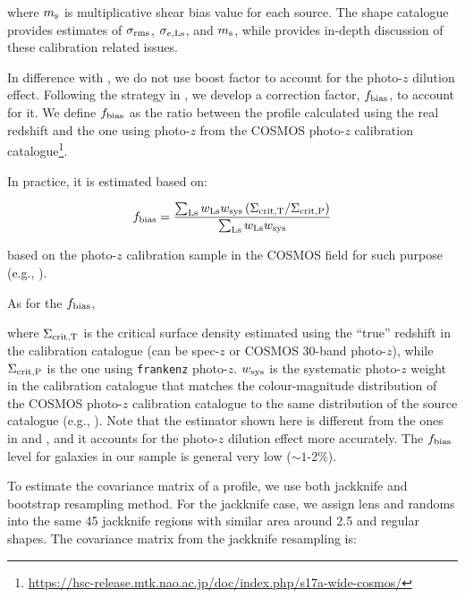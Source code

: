 \documentclass[fleqn,usenatbib,useAMS]{mnras}
\begin{document}
    \noindent where $m_{\rm s}$ is multiplicative shear bias value for each source.
    The shape catalogue provides estimates of $\sigma_{\rm rms}$, $\sigma_{e, \rm Ls}$, and $m_{\rm
    s}$, while \citet{HSC-WLCALIB} provides in-depth discussion of these calibration related
    issues.

    In difference with \citet{Singh2017}, we do not use boost factor to account for the photo-$z$
    dilution effect.
    Following the strategy in \citet{Leauthaud2017}, we develop a correction
    factor, $f_{\rm bias}$, to account for it.
    We define $f_{\rm bias}$ as the ratio between the \dsigma{} profile calculated using
    the real redshift and the one using photo-$z$ from the COSMOS photo-$z$ calibration
    catalogue\footnote{
    \url{https://hsc-release.mtk.nao.ac.jp/doc/index.php/s17a-wide-cosmos/}}.

    In practice, it is estimated based on:

    \begin{equation}
        f_{\rm bias} = \frac{
            \sum_{\rm Ls} w_{\rm Ls} w_{\rm sys} \left(\Sigma_{{\rm crit, T}} / \Sigma_{{\rm crit, P}} \right)}
            {\sum_{\rm Ls} w_{\rm Ls} w_{\rm sys}}
        \label{eq:fbias}
    \end{equation}

    based on the photo-$z$ calibration sample in the COSMOS field for
    such purpose
    (e.g., \citealt{Mandelbaum2008, Nakajima2012, Leauthaud2017}).

    As for the $f_{\rm bias}$,

    \noindent where $\Sigma_{{\rm crit, T}}$ is the critical surface density estimated using the
    ``true'' redshift in the calibration catalogue (can be spec-$z$ or COSMOS 30-band photo-$z$),
    while $\Sigma_{{\rm crit, P}}$ is the one using \texttt{frankenz} photo-$z$.
    $w_{\rm sys}$ is the systematic photo-$z$ weight in the calibration catalogue that matches the
    colour-magnitude distribution of the COSMOS photo-$z$ calibration catalogue to the same
    distribution of the source catalogue (e.g., \citealt{Mandelbaum2008, Nakajima2012}).
    Note that the estimator shown here is different from the ones in \citet{Leauthaud2017} and
    \citet{Speagle2019}, and it accounts for the photo-$z$ dilution effect more accurately.
    The $f_{\rm bias}$ level for galaxies in our sample is general very low ($\sim 1$-2\%).

    To estimate the covariance matrix of a \dsigma{} profile, we use both jackknife and
    bootstrap resampling method.
    For the jackknife case, we assign lens and randoms into the same 45 jackknife regions with
    similar area around 2.5 \sqdeg{} and regular shapes.
    The covariance matrix from the jackknife resampling is:
\end{document}
